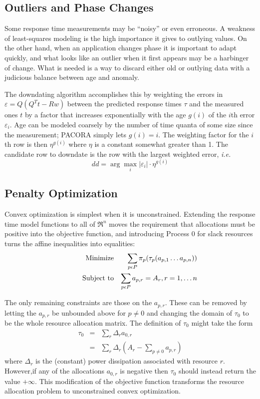 \subsection*{Outliers and Phase Changes}

Some response time measurements may be ``noisy'' or even erroneous.
A weakness of least-squares modeling is the high importance it gives to outlying values.
On the other hand, when an application changes phase it is important to adapt quickly,
and what looks like an outlier when it first appears may be a harbinger of change.
What is needed is a way to discard either old or outlying data
with a judicious balance between age and anomaly.

The downdating algorithm accomplishes this by weighting the errors in $\varepsilon = Q(Q^Tt - Rw)$
between the predicted response times $\tau$ and the measured ones $t$ by a factor
that increases exponentially with the age $g(i)$ of the $i$th error $\varepsilon_i$.
Age can be modeled coarsely by the number of time quanta of some size since the measurement;
PACORA simply lets $g(i) = i$.
The weighting factor for the $i$th row is then $\eta^{g(i)}$ where $\eta$ is a constant somewhat greater than 1.
The candidate row to downdate is the row with the largest weighted error, \emph{i.e.}
\begin{displaymath}
dd = \arg\max_i |\varepsilon_i| \cdot \eta^{g(i)}
\end{displaymath}

\subsection*{Penalty Optimization}

Convex optimization is simplest when it is unconstrained.
Extending the response time model functions to all of $\Re^n$
moves the requirement that allocations must be positive into the objective function,
and introducing Process 0 for slack resources turns the affine inequalities into equalities:
\begin{eqnarray*}
& \makebox[1in][r]{Minimize}   & \sum_{p\epsilon P} {\pi_p(\tau_p(a_{p,1}\ldots a_{p,n}))}  \\
& \makebox[1in][r]{Subject to} & \sum_{p\epsilon P} a_{p,r} = A_r, r = 1,\ldots n           \\
\end{eqnarray*}

The only remaining constraints are those on the $a_{p,r}$.
These can be removed by letting the $a_{p,r}$ be unbounded above for $p \neq 0$
and changing the domain of $\tau_0$  to be the whole resource allocation matrix.
The definition of $\tau_0$ might take the form
\begin{eqnarray*}
\tau_0 &=& \sum_r \Delta_r a_{0,r}     \\
       &=& \sum_r \Delta_r ( A_r - \sum_{p \neq 0} a_{p,r} )
\end{eqnarray*}
where $\Delta_r$ is the (constant) power dissipation associated with resource $r$.
However,if any of the allocations $a_{0,r}$ is negative then $\tau_0$  should instead return the value $+\infty$.
This modification of the objective function transforms the resource allocation problem
to unconstrained convex optimization.

